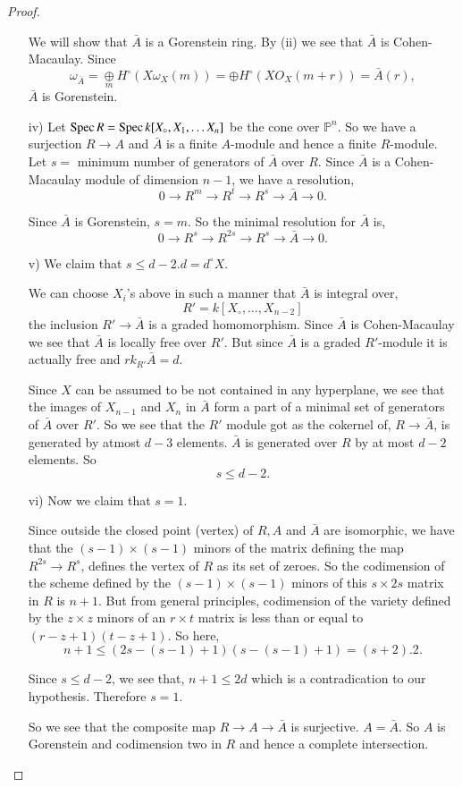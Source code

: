 \begin{proof}
\begin{itemize}
We will show that $\bar{A}$ is a Gorenstein ring. By (ii) we see that
$\bar{A}$ is Cohen-Macaulay. Since 
$$
\omega_{\bar{A}}=\underset{m}{\oplus}H^\circ(X\omega_X(m))=\oplus
H^\circ (XO_X(m+r))=\bar{A}(r),
$$
$\bar{A}$ is Gorenstein.
\item [iv)] Let $\operatorname{Spec} R=\operatorname{Spec} k[X_\circ,X_1,\ldots X_n]$ be the cone
  over $\mathbb{P}^n$. So we have a surjection $R\longrightarrow A$
  and $\bar{A}$ is a finite $A$-module and hence a finite
  $R$-module. Let $s=$ minimum number of generators of $\bar{A}$ over
  $R$. Since $\bar{A}$ is a Cohen-Macaulay module of dimension $n-1$,
  we have a resolution, 
$$
0\longrightarrow R^m\longrightarrow R^t\longrightarrow
R^s\longrightarrow\bar{A}\longrightarrow 0.
$$

Since $\bar{A}$ is Gorenstein, $s=m$. So the minimal resolution for
$\bar{A}$ is,
$$
0\longrightarrow R^s\longrightarrow R^{2s}\longrightarrow R^s
\longrightarrow \bar{A}\longrightarrow 0.
$$

\item [v)] We claim that $s\leq d-2. d=d^\circ X$.

We can choose $X_i$'s above in such a manner that $\bar{A}$ is
integral over,
$$
R'=k[X_\circ,\ldots,X_{n-2}]
$$\pageoriginale
the inclusion $R'\longrightarrow\bar{A}$ is a graded
homomorphism. Since $\bar{A}$ is Cohen-Macaulay we see that $\bar{A}$
is locally free over $R'$. But since $\bar{A}$ is a graded $R'$-module
it is actually free and $rk_{R'}\bar{A}=d$.

Since $X$ can be assumed to be not contained in any hyperplane, we see
that the images of $X_{n-1}$ and $X_n$ in $\bar{A}$ form a part of a
minimal set of generators of $\bar{A}$ over $R'$. So we see that the
$R'$ module got as the cokernel of, $R\longrightarrow\bar{A}$, is
generated by atmost $d-3$ elements. \ie $\bar{A}$ is generated over
$R$ by at most $d-2$ elements. So 
$$
s\leq d-2.
$$

\item [vi)] Now we claim that $s=1$. 

Since outside the closed point (vertex) of $R, A$ and $\bar{A}$ are
isomorphic, we have that the $(s-1) \times (s-1)$ minors of the matrix
defining the map $R^{2s}\longrightarrow R^s$, defines the vertex of
$R$ as its set of zeroes. So the codimension of the scheme defined by
the $(s-1) \times (s-1)$ minors of this $s  \times 2s$ matrix in $R$ is $n+1$. But
from general principles, codimension of the variety defined by the
$z \times z$ minors of an $r \times t$ matrix is less than or equal to
$(r-z+1)(t-z+1)$. So here, 
$$
n+1\leq (2s-(s-1)+1)(s-(s-1)+1)=(s+2).2.
$$

Since $s\leq d-2$, we see that, $n+1\leq 2d$ which is a contradication
to our hypothesis. Therefore $s=1$. 

So we see that the composite map $R\longrightarrow A\longrightarrow
\bar{A}$ is surjective. \ie $A=\bar{A}$. So $A$ is Gorenstein and
codimension two in $R$ and hence a complete intersection. 
\end{itemize}
\end{proof}



